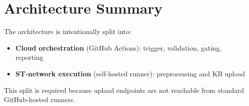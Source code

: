 \documentclass[11pt,a4paper]{article}
\begin{document}
\section{Architecture Summary}
The architecture is intentionally split into:
\begin{itemize}
  \item \textbf{Cloud orchestration} (GitHub Actions): trigger, validation, gating, reporting
  \item \textbf{ST-network execution} (self-hosted runner): preprocessing and KB upload
\end{itemize}
This split is required because upload endpoints are not reachable from standard GitHub-hosted runners.
\end{document}
